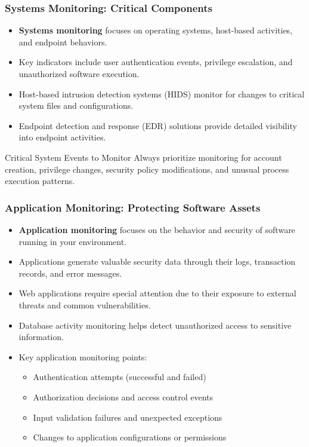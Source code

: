\documentclass{beamer}
\begin{document}
\begin{frame}
\frametitle{Systems Monitoring: Critical Components}
\begin{itemize}
\item \textbf{Systems monitoring} focuses on operating systems, host-based activities, and endpoint behaviors.
\item Key indicators include user authentication events, privilege escalation, and unauthorized software execution.
\item Host-based intrusion detection systems (HIDS) monitor for changes to critical system files and configurations.
\item Endpoint detection and response (EDR) solutions provide detailed visibility into endpoint activities.
\end{itemize}

\begin{alertblock}{Critical System Events to Monitor}
Always prioritize monitoring for account creation, privilege changes, security policy modifications, and unusual process execution patterns.
\end{alertblock}
\end{frame}

\begin{frame}
\frametitle{Application Monitoring: Protecting Software Assets}
\begin{itemize}
\item \textbf{Application monitoring} focuses on the behavior and security of software running in your environment.
\item Applications generate valuable security data through their logs, transaction records, and error messages.
\item Web applications require special attention due to their exposure to external threats and common vulnerabilities.
\item Database activity monitoring helps detect unauthorized access to sensitive information.
\end{itemize}

\begin{itemize}
\item Key application monitoring points:
\begin{itemize}
\item Authentication attempts (successful and failed)
\item Authorization decisions and access control events
\item Input validation failures and unexpected exceptions
\item Changes to application configurations or permissions
\end{itemize}
\end{itemize}
\end{frame}
\end{document}
